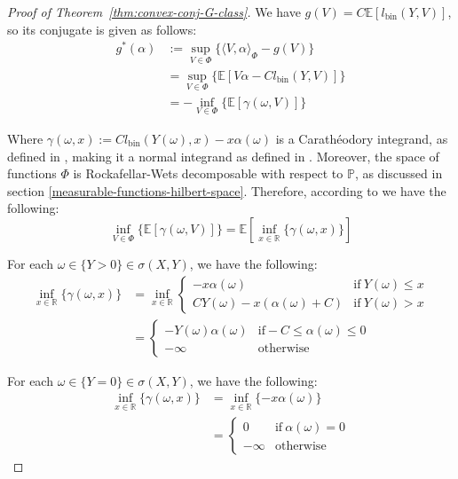 \documentclass{article}
\begin{document}
\begin{proof}[Proof of Theorem~\ref{thm:convex-conj-G-class}]
We have $g(V) = C \mathbb{E}[l_{\text{bin}}(Y , V)]$, so its conjugate is given as follows:
\begin{align}
g^{*}(\alpha) & := \sup_{V \in \Phi} \{\langle V , \alpha \rangle_{\Phi} - g(V)\} \\
 & = \sup_{V \in \Phi} \{\mathbb{E}[V \alpha - C l_{\text{bin}}(Y , V)]\} \\
 & = - \inf_{V \in \Phi} \{\mathbb{E}[\gamma(\omega, V)]\} 
\end{align}

Where $\gamma(\omega, x) := C l_{\text{bin}}(Y(\omega), x) - x \alpha(\omega)$ is a Carathéodory integrand, as defined in \cite[Example 14.29]{Rockafellar1997-gr}, making it a normal integrand as defined in \cite[Definition 14.27]{Rockafellar1997-gr}. Moreover, the space of functions $\Phi$ is Rockafellar-Wets decomposable with respect to $\mathbb{P}$, as discussed in section \ref{measurable-functions-hilbert-space}. Therefore, according to \cite[Theorem 14.60]{Rockafellar1997-gr} we have the following:
\begin{equation}\label{optimal-solution-equivalence}
\inf_{V \in \Phi} \{\mathbb{E}[\gamma(\omega, V)]\} = \mathbb{E}\left[\inf_{x \in \mathbb{R}} \{\gamma(\omega, x)\}\right]
\end{equation} 

For each $\omega \in \{Y > 0\} \in \sigma(X, Y)$, we have the following:
\begin{align}
\inf_{x \in \mathbb{R}}\{\gamma(\omega, x)\} & = \inf_{x \in \mathbb{R}} \begin{cases}
 - x \alpha(\omega) &\text{if}\ Y(\omega) \leq x \\
 C Y(\omega) - x (\alpha(\omega) + C) &\text{if}\ Y(\omega) > x
\end{cases} \\
 & = \begin{cases}
 - Y(\omega) \alpha(\omega) &\text{if} - C \leq \alpha(\omega) \leq 0 \\
 - \infty &\text{otherwise}
\end{cases}
\end{align}

For each $\omega \in \{Y = 0\} \in \sigma(X, Y)$, we have the following: 
\begin{align}
\inf_{x \in \mathbb{R}}\{\gamma(\omega, x)\} & = \inf_{x \in \mathbb{R}}\{- x \alpha(\omega)\} \\
 & = \begin{cases}
 0 &\text{if}\ \alpha(\omega) = 0 \\
 -\infty & \text{otherwise}
\end{cases}
\end{align}


\end{proof}
\end{document}
